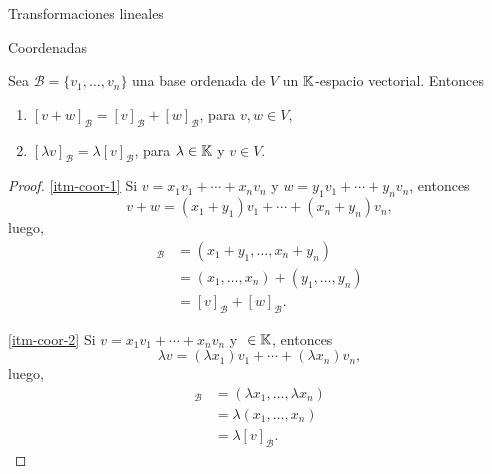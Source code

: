 \begin{chapter}{Transformaciones lineales}
\begin{section}{Coordenadas}
    \begin{proposicion}\label{vectorbase->lineal}
        Sea $\mathcal{B}=\{v_1,\ldots,v_n\}$ una base ordenada de $V$ un $\mathbb K$-espacio vectorial. Entonces
        \begin{enumerate}
            \item\label{itm-coor-1} $[v + w]_\mathcal{B} = [v]_\mathcal{B} +[w]_\mathcal{B}$, para $v,w \in V$,
            \item\label{itm-coor-2} $[\lambda v]_\mathcal{B} = \lambda[v]_\mathcal{B}$, para $\lambda \in \mathbb K$ y $v \in V$.
        \end{enumerate}
    \end{proposicion} 
    \begin{proof}
        \ref{itm-coor-1} Si $v = x_1v_1 + \cdots +x_nv_n$ y $w = y_1v_1 + \cdots +y_nv_n$, entonces 
        $$
        v + w = (x_1+y_1)v_1 + \cdots +(x_n+y_n)v_n,
        $$
        luego,
        \begin{align*}
            [v + w]_\mathcal{B} &=(x_1+y_1,\ldots ,x_n+y_n) \\
            &= (x_1,\ldots, x_n) +(y_1,\ldots , y_n) \\
            &= [v]_\mathcal{B} +[w]_\mathcal{B}.
        \end{align*}
                
        \ref{itm-coor-2} Si $v = x_1v_1 + \cdots +x_nv_n$ y $\ \in \mathbb K$, entonces 
        $$
        \lambda v = (\lambda x_1)v_1 + \cdots +(\lambda x_n)v_n,
        $$
        luego,
        \begin{align*}
            [\lambda v ]_\mathcal{B} &= (\lambda x_1,\ldots , \lambda x_n )\\
        &= \lambda (x_1,\ldots ,x_n) \\
        &= \lambda [v]_\mathcal{B}.
        \end{align*}
    \end{proof}
    
    
    \end{section}



\end{chapter}
